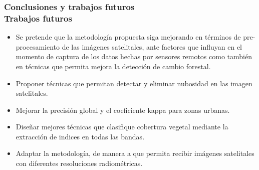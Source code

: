 \documentclass[xcolor=table]{beamer}
\begin{document}
																\begin{frame}
																	\frametitle{Conclusiones y trabajos futuros\\Trabajos futuros}						
																	
																	
																		\begin{itemize}
																			\item Se pretende que la metodolog\'ia propuesta siga mejorando en t\'erminos de pre-procesamiento de las im\'agenes satelitales, ante factores que influyan en el momento de captura de los datos hechas por sensores remotos como tambi\'en en t\'ecnicas que permita mejora la detecci\'on de cambio forestal.
																			\item Proponer t\'ecnicas que permitan detectar y eliminar nubosidad en las imagen satelitales.
																			\item Mejorar la precisi\'on global y el coeficiente kappa para zonas urbanas.
																			\item Dise\~{n}ar mejores t\'ecnicas que clasifique cobertura vegetal mediante la extracci\'on de indices en todas las bandas.
																			\item Adaptar la metodolog\'ia, de manera a que permita recibir im\'agenes satelitales con diferentes resoluciones radiom\'etricas.
																		\end{itemize}
																		
																	
																	
																	
																\end{frame}	
																
																
															
\end{document}
